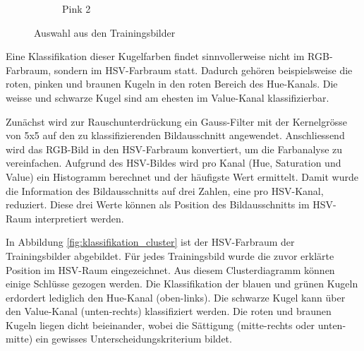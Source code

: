 \begin{figure}[h!]
\begin{subfigure}[b]{0.15\textwidth}
        \caption{Pink 2}
        \label{fig:classification_pink_ball_2}
    \end{subfigure}
    \caption{Auswahl aus den Trainingsbilder}
    \label{fig:classification_trainingdata_examples}
\end{figure}

Eine Klassifikation dieser Kugelfarben findet sinnvollerweise nicht im RGB-Farbraum, sondern im HSV-Farbraum\cite{wiki:hsv_color_space} statt.
Dadurch gehören beispielsweise die roten, pinken und braunen Kugeln in den roten Bereich des Hue-Kanals.
Die weisse und schwarze Kugel sind am ehesten im Value-Kanal klassifizierbar.

Zunächst wird zur Rauschunterdrückung ein Gauss-Filter mit der Kernelgrösse von 5x5 auf den zu klassifizierenden Bildausschnitt angewendet.
Anschliessend wird das RGB-Bild in den HSV-Farbraum konvertiert, um die Farbanalyse zu vereinfachen.
Aufgrund des HSV-Bildes wird pro Kanal (Hue, Saturation und Value) ein Histogramm berechnet und der häufigste Wert ermittelt.
Damit wurde die Information des Bildausschnitts auf drei Zahlen, eine pro HSV-Kanal, reduziert.
Diese drei Werte können als Position des Bildausschnitts im HSV-Raum interpretiert werden.

In Abbildung \ref{fig:klassifikation_cluster} ist der HSV-Farbraum der Trainingsbilder abgebildet.
Für jedes Trainingsbild wurde die zuvor erklärte Position im HSV-Raum eingezeichnet.
Aus diesem Clusterdiagramm können einige Schlüsse gezogen werden.
Die Klassifikation der blauen und grünen Kugeln erdordert lediglich den Hue-Kanal (oben-links).
Die schwarze Kugel kann über den Value-Kanal (unten-rechts) klassifiziert werden.
Die roten und braunen Kugeln liegen dicht beieinander, wobei die Sättigung (mitte-rechts oder unten-mitte) ein gewisses Unterscheidungskriterium bildet.


